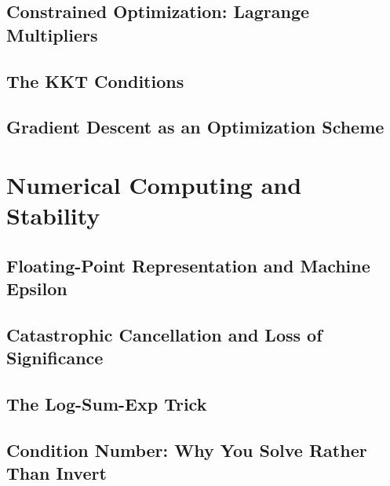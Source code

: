 \subsection{Constrained Optimization: Lagrange Multipliers}

\subsection{The KKT Conditions}

\subsection{Gradient Descent as an Optimization Scheme}

\section{Numerical Computing and Stability}
\label{sec:numerical-stability}


\subsection{Floating-Point Representation and Machine Epsilon}


\subsection{Catastrophic Cancellation and Loss of Significance}

\subsection{The Log-Sum-Exp Trick}


\subsection{Condition Number: Why You Solve Rather Than Invert}

